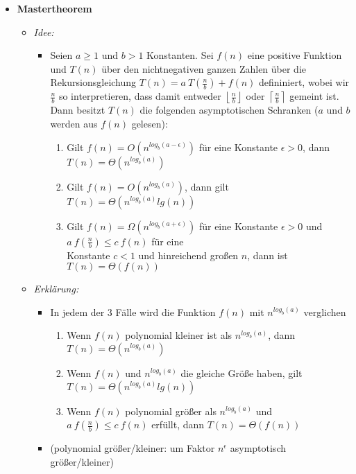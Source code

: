 \begin{itemize}
        \item \textbf{Mastertheorem}
            \begin{itemize}
                \item \textit{Idee:}
                    \begin{itemize}
                        \item[] 
                            Seien $a \geq 1$ und $b > 1$ Konstanten. Sei $f(n)$ eine positive Funktion und $T(n)$ 
                            über den nichtnegativen ganzen Zahlen über die Rekursionsgleichung $T(n) = a~T(\frac{n}{b}) + f(n)$
                            defininiert, wobei wir $\frac{n}{b}$ so interpretieren, dass damit entweder $\left \lfloor \frac{n}{b} \right \rfloor$
                            oder $\left \lceil \frac{n}{b} \right \rceil$ gemeint ist. Dann besitzt $T(n)$ die folgenden asymptotischen Schranken
                            ($a$ und $b$ werden aus $f(n)$ gelesen):
                            \begin{enumerate}
                                \item Gilt $f(n) = O(n^{log_b (a - \epsilon)})$ für eine Konstante $\epsilon > 0$, dann $T(n) = \Theta(n^{log_b (a)})$
                                \item Gilt $f(n) = O(n^{log_b (a)})$, dann gilt $T(n) = \Theta(n^{log_b (a)} lg(n))$
                                \item Gilt $f(n) = \Omega(n^{log_b (a+\epsilon)})$ für eine Konstante $\epsilon > 0$ und $a~f(\frac{n}{b}) \leq c~f(n)$
                                      für eine \\ Konstante $c < 1$ und hinreichend großen $n$, dann ist $T(n) = \Theta(f(n))$
                            \end{enumerate}
                    \end{itemize}
                
                \item \textit{Erklärung:}
                    \begin{itemize}
                        \item In jedem der 3 Fälle wird die Funktion $f(n)$ mit $n^{log_b(a)}$ verglichen
                            \begin{enumerate}
                                \item Wenn $f(n)$ polynomial kleiner ist als $n^{log_b(a)}$, dann $T(n) = \Theta(n^{log_b(a)})$
                                \item Wenn $f(n)$ und $n^{log_b(a)}$ die gleiche Größe haben, gilt $T(n) = \Theta(n^{log_b (a)} lg(n))$
                                \item Wenn $f(n)$ polynomial größer als $n^{log_b(a)}$ und $a~f(\frac{n}{b}) \leq c~f(n)$ erfüllt, dann $T(n) = \Theta(f(n))$
                            \end{enumerate}
                        \item (polynomial größer/kleiner: um Faktor $n^\epsilon$ asymptotisch größer/kleiner)
                    \end{itemize}


\end{itemize}
\end{itemize}

